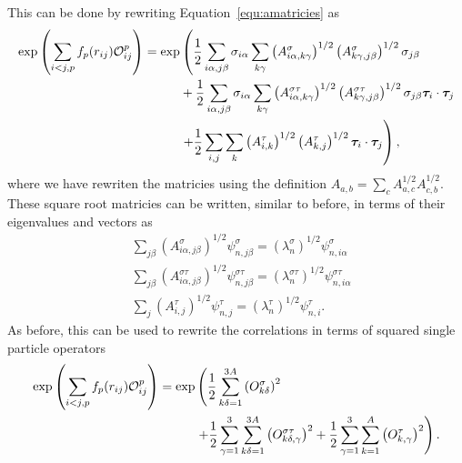 This can be done by rewriting Equation~\ref{equ:amatricies} as
\begin{equation}
\begin{split}
   \exp\left(\sum\limits_{i<j,p}f_p(r_{ij})\mathcal{O}^p_{ij}\right) = \exp&\left(\frac{1}{2}\sum\limits_{i\alpha,j\beta} \sigma_{i\alpha}\sum\limits_{k\gamma}\left(A^{\sigma}_{i\alpha,k\gamma}\right)^{1/2}\left(A^{\sigma}_{k\gamma,j\beta}\right)^{1/2}\sigma_{j\beta}\right. \\
      & + \frac{1}{2}\sum\limits_{i\alpha,j\beta} \sigma_{i\alpha}\sum\limits_{k\gamma}\left(A^{\sigma\tau}_{i\alpha,k\gamma}\right)^{1/2}\left(A^{\sigma\tau}_{k\gamma,j\beta}\right)^{1/2}\sigma_{j\beta}\bm{\tau}_i\cdot\bm{\tau}_j \\
      &\left. + \frac{1}{2}\sum\limits_{i,j} \sum\limits_{k}\left(A^{\tau}_{i,k}\right)^{1/2}\left(A^{\tau}_{k,j}\right)^{1/2}\bm{\tau}_i\cdot\bm{\tau}_j\right),
   \label{equ:amatricies}
\end{split}
\end{equation}
where we have rewriten the matricies using the definition $A_{a,b} = \sum_cA^{1/2}_{a,c}A^{1/2}_{c,b}$. These square root matricies can be written, similar to before, in terms of their eigenvalues and vectors as
\begin{align}
   &\sum\limits_{j\beta} \left(A^{\sigma}_{i\alpha,j\beta}\right)^{1/2}\psi^{\sigma}_{n,j\beta} = \left(\lambda^{\sigma}_n\right)^{1/2}\psi^{\sigma}_{n,i\alpha} \\
   &\sum\limits_{j\beta} \left(A^{\sigma\tau}_{i\alpha,j\beta}\right)^{1/2}\psi^{\sigma\tau}_{n,j\beta} = \left(\lambda^{\sigma\tau}_n\right)^{1/2}\psi^{\sigma\tau}_{n,i\alpha} \\
   &\sum\limits_{j} \left(A^{\tau}_{i,j}\right)^{1/2}\psi^{\tau}_{n,j} = \left(\lambda^{\tau}_n\right)^{1/2}\psi^{\tau}_{n,i}.
\end{align}
As before, this can be used to rewrite the correlations in terms of squared single particle operators
\begin{equation}
\begin{split}
   \exp\left(\sum\limits_{i<j,p}f_p(r_{ij})\mathcal{O}^p_{ij}\right) = \exp&\left(\frac{1}{2}\sum\limits_{k\delta=1}^{3A} \left(O_{k\delta}^{\sigma}\right)^2\right. \\
      & \left. + \frac{1}{2}\sum\limits_{\gamma=1}^{3}\sum\limits_{k\delta=1}^{3A} \left(O_{k\delta,\gamma}^{\sigma\tau}\right)^2
      + \frac{1}{2}\sum\limits_{\gamma=1}^{3}\sum\limits_{k=1}^{A} \left(O_{k,\gamma}^{\tau}\right)^2\right).
\end{split}
\end{equation}
